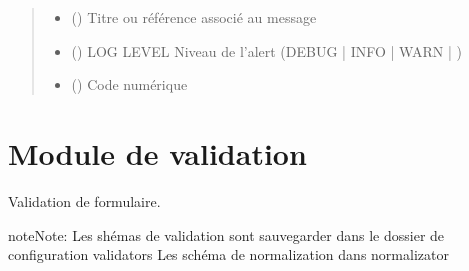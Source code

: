 \documentclass[letterpaper,10pt,french]{sphinxmanual}
\begin{document}
\begin{fulllineitems}
\begin{fulllineitems}
\begin{quote}
\begin{description}
\begin{itemize}
\item {} 
 () \textendash{} Titre ou référence associé au message

\item {} 
 () \textendash{} LOG LEVEL Niveau de l’alert (DEBUG | INFO | WARN | )

\item {} 
 () \textendash{} Code numérique

\end{itemize}

\end{description}\end{quote}

\end{fulllineitems}


\end{fulllineitems}



\chapter{Module de validation}
\label{\detokenize{classes/cfgloader:module-de-validation}}
Validation de formulaire.

\begin{sphinxadmonition}{note}{Note:}
Les shémas de validation sont sauvegarder dans le dossier de configuration validators
Les schéma de normalization dans normalizator
\end{sphinxadmonition}
\label{\detokenize{classes/cfgloader:module-toolbox.validata}}
\end{document}
